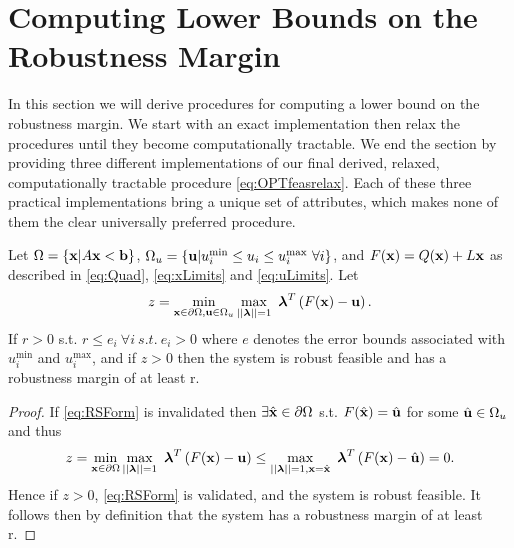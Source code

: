 \section{Computing Lower Bounds on the Robustness Margin} \label{sec:inbdform}  
In this section we will derive procedures for computing a lower bound on the robustness margin. 
We start with an exact implementation then relax the procedures until they become computationally tractable. 
We end the section by providing three different implementations of our final derived, relaxed, computationally tractable procedure \ref{eq:OPTfeasrelax}.
Each of these three practical implementations bring a unique set of attributes, which makes none of them the clear universally preferred procedure.

\begin{thm}
Let $\Omega=\{\mathbf{x}| A\mathbf{x}< \mathbf{b}\}$, $\Omega_{u}=\{\mathbf{u}| u^{\min}_i\leq u_i \leq u^{\max}_i \ \forall i \}$, and $F(\mathbf{x})=Q(\mathbf{x})+L\mathbf{x}$ as described in \ref{eq:Quad}, \ref{eq:xLimits} and \ref{eq:uLimits}. 
Let
$$z = \min\limits_{\vx\in \partial \Omega, \vu\in \Omega_{u} }\max\limits_{||\boldsymbol{\lambda}||=1}\ \boldsymbol{\lambda}^T\left(F(\vx)-\vu\right).$$
If $r>0$ s.t. $r\leq e_i \ \forall i \ s.t. \ e_i>0$ where $e$ denotes the error bounds associated with $ u^{\min}_i$ and $ u^{\max}_i$, and if $z>0$ then the system is robust feasible and has a robustness margin of at least r.

\begin{proof} 
If \cref{eq:RSForm} is invalidated then $\exists \hat{\mathbf{x}}\in\partial\Omega$ s.t. $F(\hat{\mathbf{x}})=\hat{\mathbf{u}}$ for some $\hat{\mathbf{u}}\in\Omega_{u}$ and thus $$z = \min\limits_{\vx\in \partial \Omega}\max\limits_{||\boldsymbol{\lambda}||=1}\ \boldsymbol{\lambda}^T\left(F(\vx)-\vu\right)\leq \max\limits_{||\boldsymbol{\lambda}||=1, \vx=\hat{\vx}}\ \boldsymbol{\lambda}^T\left(F(\vx)-\hat{\vu}\right)=0.$$ 
Hence if $z>0$, \cref{eq:RSForm} is validated, and the system is robust feasible. It follows then by definition that the system has a robustness margin of at least r.
\end{proof}
\end{thm}

